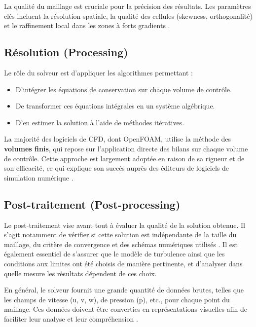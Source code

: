 La qualité du maillage est cruciale pour la précision des résultats. Les paramètres clés incluent la résolution spatiale, la qualité des cellules (skewness, orthogonalité) et le raffinement local dans les zones à forts gradients \cite{knupp1993fundamentals}.

\subsection{Résolution (Processing)}
\label{subsec:processing}

Le rôle du solveur est d'appliquer les algorithmes permettant \cite{patankar1980numerical} :
\begin{itemize}
    \item D'intégrer les équations de conservation sur chaque volume de contrôle.
    \item De transformer ces équations intégrales en un système algébrique.
    \item D'en estimer la solution à l'aide de méthodes itératives.
\end{itemize}

La majorité des logiciels de CFD, dont OpenFOAM, utilise la méthode des \textbf{volumes finis}, qui repose sur l'application directe des bilans sur chaque volume de contrôle. Cette approche est largement adoptée en raison de sa rigueur et de son efficacité, ce qui explique son succès auprès des éditeurs de logiciels de simulation numérique \cite{versteeg2007introduction}.

\subsection{Post-traitement (Post-processing)}
\label{subsec:postprocessing}

Le post-traitement vise avant tout à évaluer la qualité de la solution obtenue. Il s'agit notamment de vérifier si cette solution est indépendante de la taille du maillage, du critère de convergence et des schémas numériques utilisés \cite{roache1998verification}. Il est également essentiel de s'assurer que le modèle de turbulence ainsi que les conditions aux limites ont été choisis de manière pertinente, et d'analyser dans quelle mesure les résultats dépendent de ces choix.

En général, le solveur fournit une grande quantité de données brutes, telles que les champs de vitesse (u, v, w), de pression (p), etc., pour chaque point du maillage. Ces données doivent être converties en représentations visuelles afin de faciliter leur analyse et leur compréhension \cite{schroeder2006visualization}.


